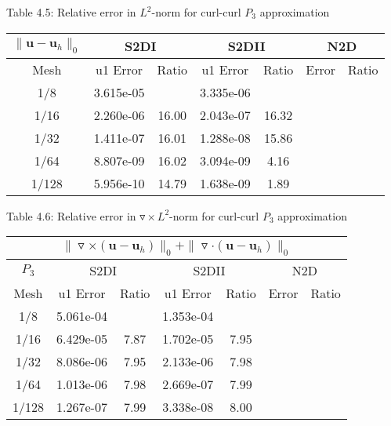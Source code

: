 \documentclass[a4paper,11pt]{article}
\begin{document}
\begin{center}
Table 4.5: {Relative error in $L^2$-norm for curl-curl $P_3$ approximation}
\begin{tabular}{|c|c|c|c|c|c|c|}
  \hline
  \multicolumn{1}{|c}{$\|\mathbf{u} - \mathbf{u}_{h}\|_{0}$} & \multicolumn{2}{|c}{S2DI} & \multicolumn{2}{|c}{S2DII}& \multicolumn{2}{|c|}{N2D}  \\
  \hline
    Mesh  & u1 Error & Ratio & u1 Error & Ratio & Error & Ratio  \\
  \hline
    1/8   &  3.615e-05 &	                & 3.335e-06 &   				&           &     \\
    1/16  &  2.260e-06 & 16.00 				& 2.043e-07	& 16.32  			&           &     \\
    1/32  &  1.411e-07 & 16.01 				& 1.288e-08	& 15.86  			&           &     \\
    1/64  &  8.807e-09 & 16.02              & 3.094e-09	& {\color{red}4.16} &           &     \\
    1/128 &  5.956e-10 & {\color{red}14.79} & 1.638e-09	& {\color{red}1.89} &           &     \\
  \hline
\end{tabular}
\end{center}
\begin{center}
Table 4.6: {Relative error in $\triangledown\times L^2$-norm for curl-curl $P_3$ approximation}
\begin{tabular}{|c|c|c|c|c|c|c|}
  \hline
  \multicolumn{7}{|c|}{$\|\triangledown\times(\mathbf{u} - \mathbf{u}_h)\|_0 + \|\triangledown\cdot(\mathbf{u} - \mathbf{u}_h)\|_0$}\\
  \hline
  \multicolumn{1}{|c}{$P_3$} & \multicolumn{2}{|c}{S2DI} & \multicolumn{2}{|c}{S2DII}& \multicolumn{2}{|c|}{N2D}  \\
  \hline
    Mesh  & u1 Error & Ratio & u1 Error & Ratio & Error & Ratio \\
  \hline
    1/8   &  5.061e-04  &	   & 1.353e-04	&	   &          &      \\
    1/16  &  6.429e-05	& 7.87 & 1.702e-05	& 7.95 &          &      \\
    1/32  &  8.086e-06	& 7.95 & 2.133e-06	& 7.98 &          &     \\
    1/64  &  1.013e-06	& 7.98 & 2.669e-07	& 7.99 &          &      \\
    1/128 &  1.267e-07	& 7.99 & 3.338e-08	& 8.00 &          &      \\
  \hline
\end{tabular}
\end{center}
\end{document}

